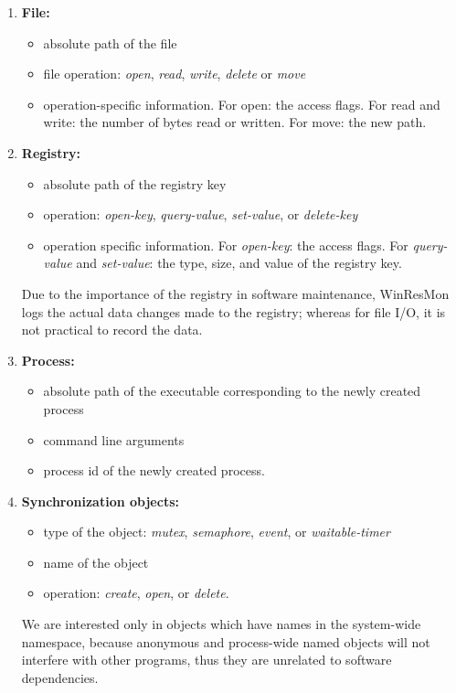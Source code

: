 \begin{enumerate}
\item {\bf File:}
\begin{itemize}
\item absolute path of the file
\item file operation: {\em open}, {\em read}, {\em write}, {\em delete}
or {\em move}
\item operation-specific information. For open: the access flags.  For read
and write: the number of bytes read or written.  For move: the new path.
\end{itemize}

\item {\bf Registry:}
\begin{itemize}
\item absolute path of the registry key
\item operation:  {\em open-key}, {\em query-value}, {\em set-value}, or {\em
delete-key}
\item operation specific information.  For {\em open-key}: the access
flags. For {\em query-value} and {\em set-value}: the type, size, and value of
the registry key.
\end{itemize}

Due to the importance of the registry in software maintenance, WinResMon logs the
actual data changes made to the registry; whereas for file I/O, it is not
practical to record the data.

\item {\bf Process:}
\begin{itemize}
\item absolute path of the executable corresponding to the newly created
process
\item command line arguments
\item process id of the newly created process.
\end{itemize}

\item {\bf Synchronization objects:}
\begin{itemize}
\item type of the object:  {\em mutex}, {\em semaphore}, {\em event}, or
{\em waitable-timer}
\item name of the object
\item operation: {\em create}, {\em open}, or {\em delete}.
\end{itemize}

We are interested only in objects which have names in the system-wide
namespace, because anonymous and process-wide named objects will not interfere
with other programs, thus they are unrelated to software dependencies.


\end{enumerate}
